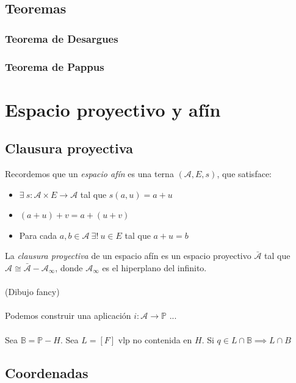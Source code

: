 \documentclass[leqno]{article}
\newcommand{\A}{\mathcal{A}}
\renewcommand{\P}{\mathbb{P}}
\renewcommand{\A}{\mathcal{A}}
\newcommand{\B}{\mathbb{B}}
\begin{document}
\subsection{Teoremas}
\subsubsection{Teorema de Desargues}
\subsubsection{Teorema de Pappus}
 

\section{Espacio proyectivo y afín}
\subsection{Clausura proyectiva}
Recordemos que un \textit{espacio afín} es una terna $(\A, E, s)$, que satisface:
\begin{itemize}
  \item $\exists \ s:\A \times E\to \A$ tal que $s(a, u) = a+u$
  \item $(a+u) + v = a + (u + v)$
  \item Para cada $a, b \in \A \ \exists ! \ u\in E $ tal que $a+ u = b$
\end{itemize}
La \textit{clausura proyectiva} de un espacio afín es un espacio proyectivo $\bar{\A}$ tal que $\A \cong \bar{\A}-\A_\infty$, donde $\A_\infty$ es el hiperplano del infinito. \\
\\
(Dibujo fancy)\\
\\
Podemos construir una aplicación $i: \A \to \P$ ... \\
\\
Sea $\B = \P-H$. Sea $L = [F]$ vlp no contenida en $H$. Si $q\in L\cap \B \implies L\cap B$  

\subsection{Coordenadas}
\end{document}
